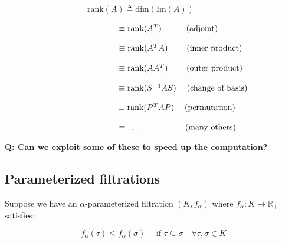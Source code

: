 \documentclass[
  letterpaper,
  DIV=11,
  numbers=noendperiod,
  oneside]{scrartcl}
\begin{document}
    

\(\hspace{10em} \mathrm{rank}(A) \triangleq \mathrm{dim}(\mathrm{Im}(A))\)

\(\hspace{10em} \hphantom{\mathrm{rank}(A)} \equiv \mathrm{rank}(A^T) \quad \quad \quad \text{(adjoint)}\)

\(\hspace{10em} \hphantom{\mathrm{rank}(A)} \equiv \mathrm{rank}(A^T A) \quad \quad \; \text{(inner product)}\)

\(\hspace{10em} \hphantom{\mathrm{rank}(A)} \equiv \mathrm{rank}(A A^T) \quad \quad \; \text{(outer product)}\)

\(\hspace{10em} \hphantom{\mathrm{rank}(A)} \equiv \mathrm{rank}(S^{-1}AS) \quad \; \text{(change of basis)}\)

\(\hspace{10em} \hphantom{\mathrm{rank}(A)} \equiv \mathrm{rank}(P^T A P) \quad \; \text{(permutation)}\)

\(\hspace{10em} \hphantom{\mathrm{rank}(A)} \equiv \dots \quad \quad \quad \quad \quad \quad \! \! \text{(many others)}\)

\textbf{Q: Can we exploit some of these to speed up the computation?}

\hypertarget{parameterized-filtrations}{%
\subsection{Parameterized filtrations}\label{parameterized-filtrations}}

Suppose we have an \(\alpha\)-parameterized filtration \((K, f_\alpha)\)
where \(f_\alpha : K \to \mathbb{R}_+\) satisfies:

\[
f_\alpha(\tau) \leq f_\alpha(\sigma) \quad \text{ if } \tau \subseteq \sigma \quad \forall \tau,\sigma \in K 
\]

\begin{figure}

\begin{minipage}[t]{0.50\linewidth}

{\centering 


}

\end{minipage}%
%
\begin{minipage}[t]{0.50\linewidth}

{\centering 


}

\end{minipage}%

\end{figure}
\end{document}
